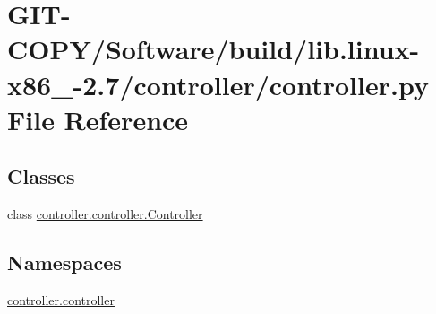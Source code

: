 \hypertarget{GIT-COPY_2Software_2build_2lib_8linux-x86__64-2_87_2controller_2controller_8py}{}\section{G\+I\+T-\/\+C\+O\+P\+Y/\+Software/build/lib.linux-\/x86\+\_-\/2.7/controller/controller.py File Reference}
\label{GIT-COPY_2Software_2build_2lib_8linux-x86__64-2_87_2controller_2controller_8py}
\subsection*{Classes}
\begin{DoxyCompactItemize}
\item 
class \hyperlink{classcontroller_1_1controller_1_1Controller}{controller.\+controller.\+Controller}
\end{DoxyCompactItemize}
\subsection*{Namespaces}
\begin{DoxyCompactItemize}
\item 
 \hyperlink{namespacecontroller_1_1controller}{controller.\+controller}
\end{DoxyCompactItemize}
